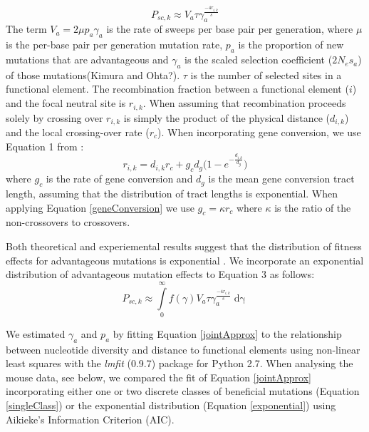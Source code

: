 \documentclass[11pt]{article}
\begin{document}
\begin{equation}
\label{singleClass}
P_{sc,k} \approx V_a \tau\gamma_a^{\frac{-4r_{i,k}}{s}} 
\end{equation}
The term $V_{a} = 2 \mu p_{a} \gamma_{a}$ is the rate of sweeps per base pair per generation, where $\mu$ is the per-base pair per generation mutation rate, $p_a$ is the proportion of new mutations that are advantageous and $\gamma_a$ is the scaled selection coefficient ($2N_es_a$) of those mutations(Kimura and Ohta?). $\tau$ is the number of selected sites in a functional element. The recombination fraction between a functional element ($i$) and the focal neutral site is $r_{i,k}$. When assuming that recombination proceeds solely by crossing over $r_{i,k}$ is simply the product of the physical distance ($d_{i,k}$) and the local crossing-over rate ($r_c$). When incorporating gene conversion, we use Equation 1 from  \cite{RN361}:
 		\begin{equation}
		\label{geneConversion}
		r_{i,k} = d_{i,k} r_c + g_c d_g \Bigg( 1 - e ^{-\frac{d_{i,k}}{d_g}} \Bigg)
		\end{equation} where $g_c$ is the rate of gene conversion and $d_g$ is the mean gene conversion tract length, assuming that the distribution of tract lengths is exponential. When applying Equation \ref{geneConversion} we use $g_c = \kappa r_c$ where $\kappa$ is the ratio of the non-crossovers to crossovers.
	
	Both theoretical and experiemental results suggest that the distribution of fitness effects for advantageous mutations is exponential \citep{RN109}. We incorporate an exponential distribution of advantageous mutation effects to Equation 3 as follows:
		\begin{equation}
		\label{exponential}
P_{sc,k} \approx \int \limits_{0}^{\infty} f(\gamma) V_a \tau\gamma_a^{\frac{-4r_{i,k}}{s}} \mathop{d\gamma}
		\end{equation}

	
	We estimated $\gamma_a$ and $p_a$ by fitting Equation \ref{jointApprox} to the relationship between nucleotide diversity and distance to functional elements using non-linear least squares with the \emph{lmfit} (0.9.7) package for Python 2.7. When analysing the mouse data, see below, we compared the fit of Equation \ref{jointApprox} incorporating either one or two discrete classes of beneficial mutations (Equation \ref{singleClass}) or the exponential distribution (Equation \ref{exponential}) using Aikieke's Information Criterion (AIC).
	
\end{document}
